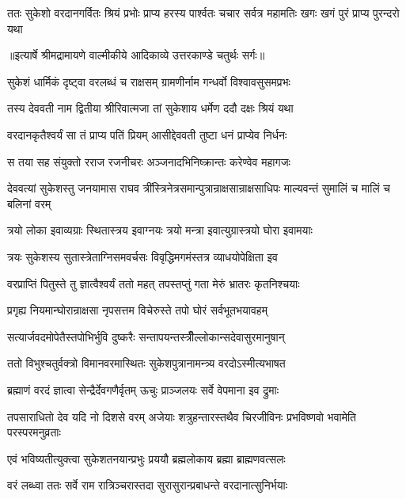 \fourlineindentedshloka
{ततः सुकेशो वरदानगर्वितः}
{श्रियं प्रभोः प्राप्य हरस्य पार्श्वतः}
{चचार सर्वत्र महामतिः खगः}
{खगं पुरं प्राप्य पुरन्दरो यथा} %


{॥इत्यार्षे श्रीमद्रामायणे वाल्मीकीये आदिकाव्ये उत्तरकाण्डे चतुर्थः सर्गः॥}


\twolineshloka
{सुकेशं धार्मिकं दृष्ट्वा वरलब्धं च राक्षसम्}
{ग्रामणीर्नाम गन्धर्वो विश्वावसुसमप्रभः} %

\twolineshloka
{तस्य देववती नाम द्वितीया श्रीरिवात्मजा}
{तां सुकेशाय धर्मेण ददौ दक्षः श्रियं यथा} %

\twolineshloka
{वरदानकृतैश्वर्यं सा तं प्राप्य पतिं प्रियम्}
{आसीद्देववती तुष्टा धनं प्राप्येव निर्धनः} %

\twolineshloka
{स तया सह संयुक्तो रराज रजनीचरः}
{अञ्जनादभिनिष्क्रान्तः करेण्वेव महागजः} %

\threelineshloka
{देववत्यां सुकेशस्तु जनयामास राघव}
{त्रींस्त्रिनेत्रसमान्पुत्रान्राक्षसान्राक्षसाधिपः}
{माल्यवन्तं सुमालिं च मालिं च बलिनां वरम्} %

\twolineshloka
{त्रयो लोका इवाव्यग्राः स्थितास्त्रय इवाग्नयः}
{त्रयो मन्त्रा इवात्युग्रास्त्रयो घोरा इवामयाः} %

\twolineshloka
{त्रयः सुकेशस्य सुतास्त्रेताग्निसमवर्चसः}
{विवृद्धिमगमंस्तत्र व्याधयोपेक्षिता इव} %

\twolineshloka
{वरप्राप्तिं पितुस्ते तु ज्ञात्वैश्वर्यं ततो महत्}
{तपस्तप्तुं गता मेरुं भ्रातरः कृतनिश्चयाः} %

\twolineshloka
{प्रगृह्य नियमान्घोरान्राक्षसा नृपसत्तम}
{विचेरुस्ते तपो घोरं सर्वभूतभयावहम्} %

\twolineshloka
{सत्यार्जवदमोपेतैस्तपोभिर्भुवि दुष्करैः}
{सन्तापयन्तस्त्रीँल्लोकान्सदेवासुरमानुषान्} %

\twolineshloka
{ततो विभुश्चतुर्वक्त्रो विमानवरमास्थितः}
{सुकेशपुत्रानामन्त्र्य वरदोऽस्मीत्यभाषत} %

\twolineshloka
{ब्रह्माणं वरदं ज्ञात्वा सेन्द्रैर्देवगणैर्वृतम्}
{ऊचुः प्राञ्जलयः सर्वे वेपमाना इव द्रुमाः} %

\threelineshloka
{तपसाराधितो देव यदि नो दिशसे वरम्}
{अजेयाः शत्रुहन्तारस्तथैव चिरजीविनः}
{प्रभविष्णवो भवामेति परस्परमनुव्रताः} %

\twolineshloka
{एवं भविष्यतीत्युक्त्वा सुकेशतनयान्प्रभुः}
{प्रययौ ब्रह्मलोकाय ब्रह्मा ब्राह्मणवत्सलः} %

\twolineshloka
{वरं लब्ध्वा ततः सर्वे राम रात्रिञ्चरास्तदा}
{सुरासुरान्प्रबाधन्ते वरदानात्सुनिर्भयाः} %

